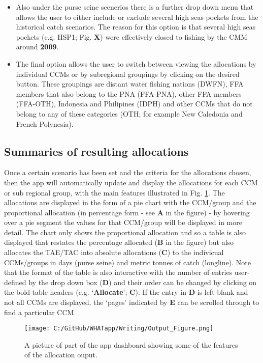 \documentclass[11pt]{article}
\begin{document}
\begin{itemize}
\item Also under the purse seine scenerios there is a further drop down menu that allows the user to either include or exclude several high seas pockets from the historical catch scenarios. The reason for this option is that several high seas pockets (e.g. HSP1; Fig. {\bf X}) were effectively closed to fishing by the CMM around {\bf 2009}.
\item The final option allows the user to switch between viewing the allocations by individual CCMs or by subregional groupings by clicking on the desired button. These groupings are distant water fishing nations (DWFN), FFA members that also belong to the PNA (FFA-PNA), other FFA members (FFA-OTH), Indonesia and Philipines (IDPH) and other CCMs that do not belong to any of these categories (OTH; for example New Caledonia and French Polynesia).
\end{itemize}


\subsection{Summaries of resulting allocations}
Once a certain scenario has been set and the criteria for the allocations chosen, then the app will automatically update and display the allocations for each CCM or sub regional group, with the main features illustrated in Fig. \ref{fig:outputpic}. The allocations are displayed in the form of a pie chart with the CCM/group and the proportional allocation (in percentage form - see {\bf A} in the figure) - by hovering over a pie segment the values for that CCM/group will be displayed in more detail. The chart only shows the proportional allocation and so a table is also displayed that restates the percentage allocated ({\bf B} in the figure) but also allocates the TAE/TAC into absolute allocations ({\bf C}) to the indivicual CCMs/groups in days (purse seine) and metric tonnes of catch (longline). Note that the format of the table is also interactive with the number of entries user-defined by the drop down box ({\bf D}) and their order can be changed by clicking on the bold table headers (e.g. `{\bf Allocate}'; {\bf C}). If the entry in {\bf D} is left blank and not all CCMs are displayed, the `pages' indicated by {\bf E} can be scrolled through to find a particular CCM.



 \begin{figure} [h]
  \centering
\texttt{[image: C:/GitHub/WHATapp/Writing/Output\_Figure.png]}
  \caption {A picture of part of the app dashboard showing some of the features of the allocation ouput.}
  \label{fig:outputpic}
\end{figure}
\end{document}
